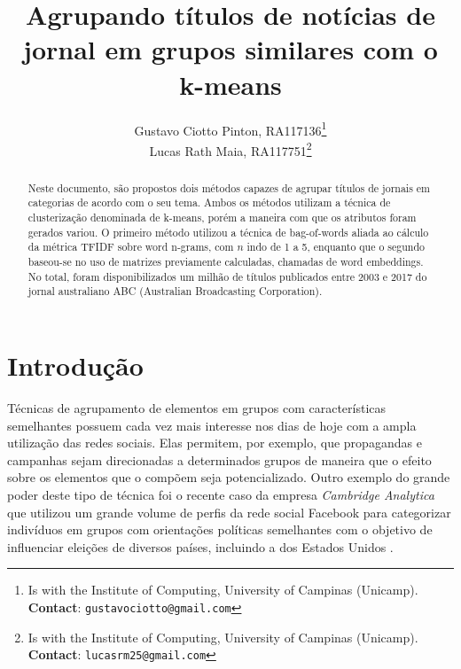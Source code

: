 \documentclass[10pt,twocolumn,letterpaper]{article}
\begin{document}
\title {Agrupando títulos de notícias de jornal em grupos similares com o k-means}
\author{Gustavo Ciotto Pinton, RA117136\thanks{Is with the Institute of Computing, University of Campinas (Unicamp). \textbf{Contact}: \tt\small{gustavociotto@gmail.com}}\\
Lucas Rath Maia, RA117751\thanks{Is with the Institute of Computing, University of Campinas (Unicamp). \textbf{Contact}: \tt\small{lucasrm25@gmail.com}}}

\maketitle
\begin{abstract}
Neste documento, são propostos dois métodos capazes de agrupar títulos de jornais em categorias de acordo com o seu tema.  Ambos os métodos utilizam a técnica de clusterização denominada de k-means, porém a maneira com que os atributos foram gerados variou. O primeiro método utilizou a técnica de bag-of-words aliada ao cálculo da métrica TFIDF sobre word n-grams, com \(n\) indo de 1 a 5, enquanto que o segundo baseou-se no uso de matrizes previamente calculadas, chamadas de word embeddings.  No total, foram disponibilizados um milhão de títulos publicados entre 2003 e 2017 do jornal australiano ABC (Australian Broadcasting Corporation).
\end{abstract}

\section{Introdução}
\label{intro}

Técnicas de agrupamento de elementos em grupos com características semelhantes possuem cada vez mais interesse nos dias de hoje com a ampla utilização das redes sociais. Elas permitem, por exemplo, que propagandas e campanhas sejam direcionadas a determinados grupos de maneira que o efeito sobre os elementos que o compõem seja potencializado. Outro exemplo do grande poder deste tipo de técnica foi o recente caso da empresa \textit{Cambridge Analytica} que utilizou um grande volume de perfis da rede social Facebook para categorizar indivíduos em grupos com orientações políticas semelhantes com o objetivo de influenciar eleições de diversos países, incluindo a dos Estados Unidos \cite{CA}.
\end{document}
